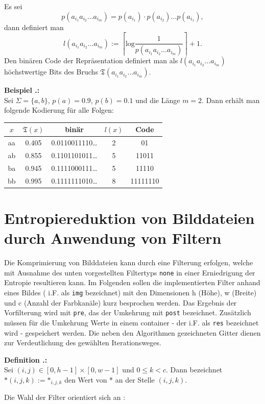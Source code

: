 \documentclass[a4paper,12pt]{article}
\newcounter{Definition}
\newcounter{Beispiel}
\newenvironment{Definition}{
\bigskip
        
        \setlength{\parindent}{0pt}
        \addtocounter{Definition}{1}
        \textbf{\textsf{Definition \thesubsection.\theDefinition}:}\\}{
        \nopagebreak
        \vspace{-1.0ex}
        \bigskip
        
}
\newenvironment{Beispiel}{
\medskip
        
        \setlength{\parindent}{0pt}
        \addtocounter{Beispiel}{1}
        \textbf{\textsf{Beispiel \thesubsection.\theBeispiel}:}\\}{
        \nopagebreak
        \vspace{-1.0ex}
        \bigskip
        
}
\begin{document}
\par
Es sei
$$
 p(a_{i_{1}}a_{i_{2}}\ldots a_{i_{m}}) = p(a_{i_{1}})·p(a_{i_{2}})...p(a_{i_{1}}),
$$
dann definiert man 
$$
l(a_{i_{1}}a_{i_{2}}\ldots a_{i_{m}}):=\left\lceil \text{log}\frac{1}{p(a_{i_{1}}a_{i_{2}}\ldots a_{i_{m}}) }\right\rceil + 1.
$$
Den binären Code der Repräsentation definiert man als $l(a_{i_{1}}a_{i_{2}}\ldots a_{i_{m}})$ höchstwertige Bits des Bruchs $\mathfrak{T}(a_{i_{1}}a_{i_{2}}\ldots a_{i_{m}})$. 
\begin{Beispiel}
Sei $\Sigma = \{a,b\}$, $p(a)=0.9$, $p(b)=0.1$ und die Länge $m=2$. Dann erhält man folgende Kodierung für alle Folgen:
\begin{center}
\begin{tabular}{c|c|c|c|c}
$x$ & $\mathfrak{T}(x)$ & binär & $l(x)$  & Code
\\
\hline
aa & 0.405 & 0.0110011110\ldots &  2 & 01
\\
\hline
ab & 0.855 & 0.1101101011\ldots & 5 & 11011
\\
\hline
ba & 0.945 & 0.1111000111\ldots & 5 & 11110
\\
\hline
bb & 0.995 &0.1111111010\ldots & 8 & 11111110
\end{tabular}
\end{center}
\end{Beispiel}
\newpage
\section{Entropiereduktion von Bilddateien durch Anwendung von Filtern}\label{Filter}
Die Komprimierung von Bilddateien kann durch eine Filterung erfolgen, welche mit Ausnahme des unten vorgestellten Filtertyps {\tt{none}} in einer Erniedrigung der Entropie resultieren kann. Im Folgenden sollen die implementierten Filter anhand eines Bildes ( i.F. als {\tt{img}} bezeichnet) mit den Dimensionen  h (Höhe), w (Breite) und c (Anzahl der Farbkanäle) kurz besprochen werden. Das Ergebnis der Vorfilterung wird mit {\tt{pre}}, das der Umkehrung mit {\tt{post}} bezeichnet. Zusätzlich müssen für die Umkehrung  Werte in einem container - der i.F. als {\tt{res}} bezeichnet wird - gespeichert werden. Die neben den Algorithmen gezeichneten Gitter dienen zur Verdeutlichung des gewählten Iterationsweges. 

\begin{Definition}
Sei  $(i,j) \in [0, h-1]\times[0, w-1]$ und $0\leq k < c$.
Dann bezeichnet  $\text{*}(i,j,k):=\text{*}_{i,j,k}$ den Wert von * an der Stelle $(i,j,k)$.
\end{Definition}
Die Wahl der Filter orientiert sich an \cite{png}:
\end{document}
